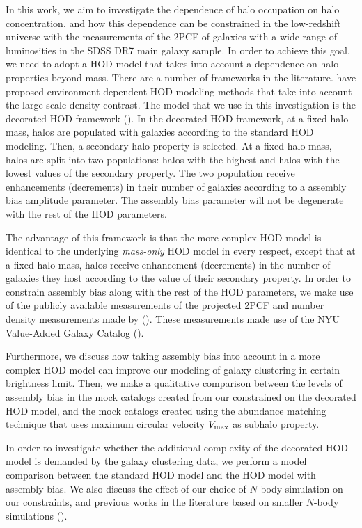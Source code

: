 \documentclass[12pt, preprint]{aastex}
\begin{document}
In this work, we aim to investigate the dependence of halo occupation on halo concentration, and how this dependence can be constrained in the low-redshift universe with the measurements of the 2PCF of galaxies with a wide range of luminosities in the SDSS DR7 main galaxy sample. 
In order to achieve this goal, we need to adopt a HOD model that takes into account 
a dependence on halo properties beyond mass. There are a number of frameworks in the literature. \citet{edHOD-tinker,edHOD-gillmartin,edHOD-weinberg} have proposed environment-dependent HOD modeling methods that take into account the large-scale density contrast. The model that we use in this investigation is the decorated HOD framework (\citealt{decorated}). In the decorated HOD framework, at a fixed halo mass, halos are populated with galaxies according to the standard HOD modeling. Then, a secondary halo property is selected. At a fixed halo mass, halos are split into two populations: halos with the highest and halos with the lowest values of the secondary property. The two population receive enhancements (decrements) in their number of galaxies according to a assembly bias amplitude parameter. The assembly bias parameter will not be degenerate with the rest of the HOD parameters. 

The advantage of this framework is that the more complex HOD model is identical to the underlying \emph{mass-only} HOD model in every respect, except that at a fixed halo mass, halos receive enhancement (decrements) in the number of galaxies they host according to the value of their secondary property. In order to constrain assembly bias along with the rest of the HOD parameters, we make use of the publicly available measurements of the projected 2PCF and number density measurements made by   
(\citealt{guo2015}). These measurements made use of the NYU Value-Added Galaxy Catalog (\citealt{Blanton2005}).

Furthermore, we discuss how taking assembly bias into account in a more complex HOD model can improve our modeling of galaxy clustering in certain brightness limit. Then, we make a qualitative comparison between the levels of assembly bias in the mock catalogs created from our constrained on the decorated HOD model, and the \citet{hw2013} mock catalogs created using the abundance matching technique that uses maximum circular velocity $V_{\rm max}$ as subhalo property.

In order to investigate whether the additional complexity of the decorated HOD model is demanded by the galaxy clustering data, we perform a model comparison between the standard HOD model and the HOD model with assembly bias. We also discuss the effect of our choice of $N$-body simulation on our constraints, and previous works in the literature based on smaller $N$-body simulations (\citealt{zentner2016}).
\end{document}
